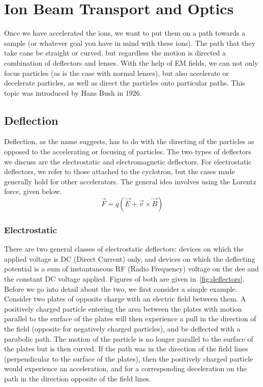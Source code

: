 
\chapter{Ion Beam Transport and Optics}\label{ch:ion-beam-transport-and-optics}

Once we have accelerated the ions, we want to put them on a path towards a sample (or whatever goal you have in mind with these ions).
The path that they take cane be straight or curved, but regardless the motion is directed a combination of deflectors and lenses.
With the help of EM fields, we can not only focus particles (as is the case with normal lenses), but also accelerate or decelerate particles, as well as direct the particles onto particular paths.
This topic was introduced by Hans Bush in 1926.

\section{Deflection}\label{sec:deflection}
Deflection, as the name suggests, has to do with the directing of the particles as opposed to the accelerating or focusing of particles.
The two types of deflectors we discuss are the electrostatic and electromagnetic deflectors.
For electrostatic deflectors, we refer to those attached to the cyclotron, but the cases made generally hold for other accelerators.
The general idea involves using the Lorentz force, given below. $$ \vec{F} = q(\vec{E} + \vec{v} \times \vec{B}) $$

\subsection{Electrostatic}\label{subsec:electrostatic}

There are two general classes of electrostatic deflectors: devices on which the applied voltage is DC (Direct Current) only, and devices on which the deflecting potential is a sum of instantaneous RF (Radio Frequency) voltage on the dee and the constant DC voltage applied.
Figures of both are given in~\ref{fig:deflectors}.
Before we go into detail about the two, we first consider a simple example.
Consider two plates of opposite charge with an electric field between them.
A positively charged particle entering the area between the plates with motion parallel to the surface of the plates will then experience a pull in the direction of the field (opposite for negatively charged particles), and be deflected with a parabolic path.
The motion of the particle is no longer parallel to the surface of the plates but is then curved.
If the path was in the direction of the field lines (perpendicular to the surface of the plates), then the positively charged particle would experience an acceleration, and for a corresponding deceleration on the path in the direction opposite of the field lines.

